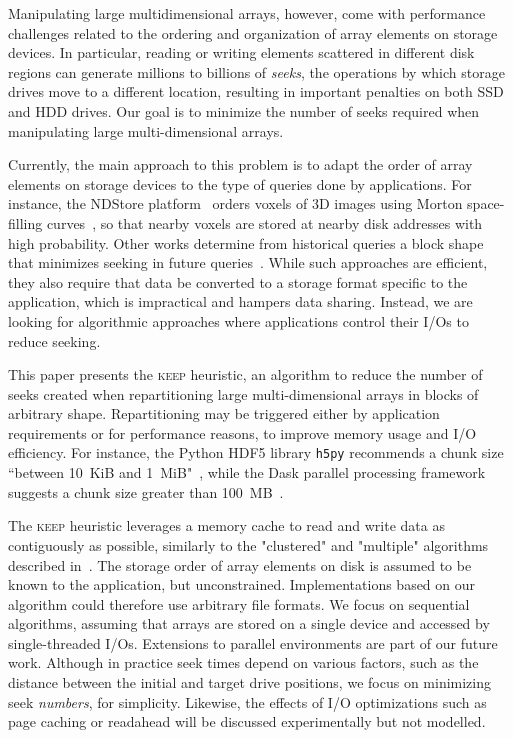 \documentclass[sigconf, nonacm]{acmart}
\newcommand{\keep}[0]{\textsc{keep}\xspace}
\begin{document}
Manipulating large multidimensional arrays, however, come with performance
challenges related to the ordering and organization of array elements on
storage devices. In particular, reading or writing elements scattered in different
disk regions can generate millions to billions of \emph{seeks}, the
operations by which storage drives move to a different location, resulting
in important penalties on both SSD and HDD drives. Our goal is to minimize the number of seeks required when manipulating
large multi-dimensional arrays.

Currently, the main approach to this problem is to adapt the order of array
elements on storage devices to the type of queries done by applications.
For instance, the NDStore platform~\cite{lillaney2018building} orders voxels of 3D images
using Morton space-filling curves~\cite{morton1966computer}, so that nearby
voxels are stored at nearby disk addresses with high
probability. Other works determine from historical queries a
block shape that minimizes seeking
in future queries~\cite{optimal_chuking}.
While such approaches are efficient, they also require that data
be converted to a storage format specific to the application, which is
impractical and hampers data sharing. Instead, we are looking for
algorithmic approaches where applications control their I/Os to reduce seeking.

This paper presents the \keep heuristic, an algorithm to reduce the
number of seeks created when repartitioning large multi-dimensional arrays in blocks of
arbitrary shape. Repartitioning may be triggered either by application requirements
 or for performance reasons, to improve
memory usage and I/O efficiency. For instance, the Python HDF5 library
\texttt{h5py} recommends a chunk size ``between 10~KiB and 1~MiB"~\cite{collette_2014}, while the Dask parallel processing framework
~\cite{matthew_rocklin-proc-scipy-2015} suggests a chunk size greater than
100~MB~\cite{rocklin_bourbeau_2019}.

The \keep heuristic leverages a memory cache to read and write data as
contiguously as possible, similarly to the "clustered" and "multiple"
algorithms described in~\cite{seqalgorithms}. The storage order of array
elements on disk is assumed to be known to the application, but unconstrained.
Implementations based on our algorithm could therefore use arbitrary file
formats. We focus on sequential algorithms, assuming that arrays are stored
on a single device and accessed by single-threaded I/Os. Extensions to parallel
environments are part of our future work. Although in practice seek times
depend on various factors, such as the distance between the initial and
target drive positions, we focus on minimizing seek \emph{numbers}, for
simplicity. Likewise, the effects of I/O optimizations such as page caching
or readahead will be discussed experimentally but not modelled.
\end{document}
